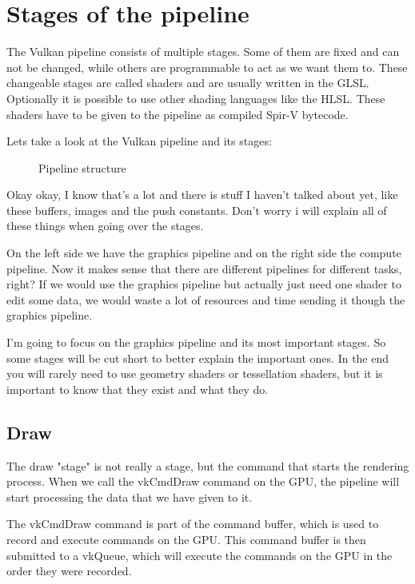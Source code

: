 \documentclass[12pt]{report} \usepackage{preamble}
\begin{document}
\section{Stages of the pipeline}

The Vulkan pipeline consists of multiple stages. Some of them are fixed
and can not be changed, while others are programmable to act as we
want them to. These changeable stages are called shaders and are usually
written in the \ac{GLSL}. Optionally it is possible
to use other shading languages like the \ac{HLSL}.
These shaders have to be given to the pipeline as compiled \ac{Spir-V} bytecode. \cite{spirv}

Lets take a look at the Vulkan pipeline and its stages:

\begin{figure}[hbtp]
	\fontsize{6}{10}\selectfont
	\centering 
	\caption{Pipeline structure \cite{fig:pipeline}}
\end{figure} \Floatbarrier

Okay okay, I know that's a lot and there is stuff I haven't talked about
yet, like these buffers, images and the push constants. Don't worry i
will explain all of these things when going over the stages.

On the left side we have the graphics pipeline and on the right side the
compute pipeline. Now it makes sense that there are different pipelines
for different tasks, right? If we would use the graphics pipeline but
actually just need one shader to edit some data, we would waste a lot
of resources and time sending it though the graphics pipeline.

I'm going to focus on the graphics pipeline and its most important stages.
So some stages will be cut short to better explain the important ones.
In the end you will rarely need to use geometry shaders or tessellation
shaders, but it is important to know that they exist and what they do.

\subsection{Draw}

The draw "stage" is not really a stage, but the command that starts
the rendering process. When we call the vkCmdDraw command on the \ac{GPU},
the pipeline will start processing the data that we have given to
it. \cite{vulkan-spec-draw}

The vkCmdDraw command is part of the command buffer, which is used to
record and execute commands on the \ac{GPU}. This command buffer is then
submitted to a vkQueue, which will execute the commands on the \ac{GPU}
in the order they were recorded. \cite{command-buffers}
\end{document}
